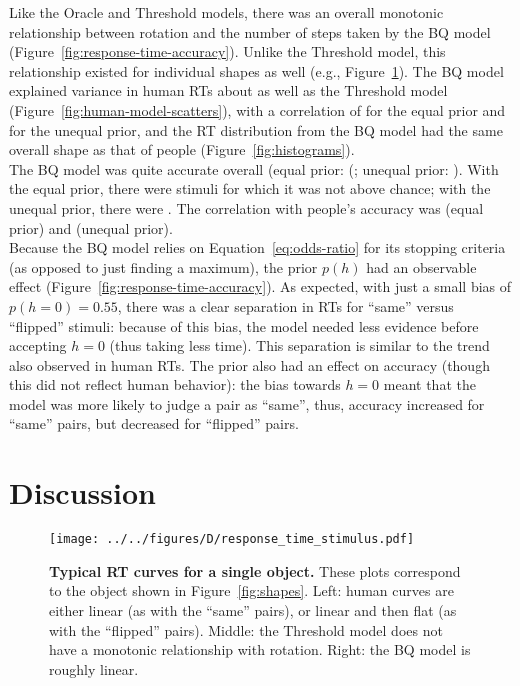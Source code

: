 \documentclass[10pt,letterpaper]{article}
\newcommand{\Oc}[0]{Oracle}
\newcommand{\Th}[0]{Threshold}
\newcommand{\Bq}[0]{BQ}
\begin{document}
Like the \Oc{} and \Th{} models, there was an overall monotonic
relationship between rotation and the number of steps taken by the
\Bq{} model (Figure~\ref{fig:response-time-accuracy}). Unlike the
\Th{} model, this relationship existed for individual shapes as well
(e.g., Figure~\ref{fig:response-time-stimulus}).  The \Bq{} model
explained variance in human RTs about as well as the \Th{} model
(Figure~\ref{fig:human-model-scatters}), with a correlation of
\BqTimeCorr{} for the equal prior and \BqpTimeCorr{} for the unequal
prior, and the RT distribution from the \Bq{} model had the same
overall shape as that of people (Figure~\ref{fig:histograms}).\\
\indent The \Bq{} model was quite accurate overall (equal prior:
(\BqAccuracy{}; unequal prior: \BqpAccuracy{}). With the equal prior,
there were \BqNumChance{} stimuli for which it was not above chance;
with the unequal prior, there were \BqpNumChance{}. The correlation
with people's accuracy was \BqAccuracyCorr{} (equal prior) and
\BqpAccuracyCorr{} (unequal prior).\\
\indent Because the \Bq{} model relies on Equation~\ref{eq:odds-ratio}
for its stopping criteria (as opposed to just finding a maximum), the
prior $p(h)$ had an observable effect
(Figure~\ref{fig:response-time-accuracy}). As expected, with just a
small bias of $p(h=0)=0.55$, there was a clear separation in RTs for
``same'' versus ``flipped'' stimuli: because of this bias, the model
needed less evidence before accepting $h=0$ (thus taking less
time). This separation is similar to the trend also observed in human
RTs. The prior also had an effect on accuracy (though this did not
reflect human behavior): the bias towards $h=0$ meant that the model
was more likely to judge a pair as ``same'', thus, accuracy increased
for ``same'' pairs, but decreased for ``flipped'' pairs.

\section{Discussion}

\begin{figure}[t]
  \begin{center}
    \texttt{[image: ../../figures/D/response\_time\_stimulus.pdf]}
    \caption{\textbf{Typical RT curves for a single object.}  These
      plots correspond to the object shown in
      Figure~\ref{fig:shapes}. Left: human curves are either linear
      (as with the ``same'' pairs), or linear and then flat (as with
      the ``flipped'' pairs). Middle: the \Th{} model does not have a
      monotonic relationship with rotation. Right: the \Bq{} model is
      roughly linear.}
    \label{fig:response-time-stimulus}
  \end{center}
\end{figure}
\end{document}
